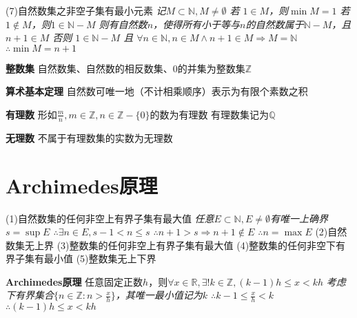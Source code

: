 \documentclass[11pt]{article}
\begin{document}
(7)自然数集之非空子集有最小元素 \newline
\textit{记$M\subset\mathbb{N}, M\not = \emptyset$ \newline
若 $1\in M$，则$\min M=1$ \newline
若 $1\not\in M$，则$1\in\mathbb{N}-M$ \newline
则有自然数$n$，使得所有小于等与$n$的自然数属于$\mathbb{N}-M$，且$n+1\in M$ \newline
否则 $1\in\mathbb{N}-M$ 且 $\forall n\in\mathbb{N}, n\in M\land n+1\in M \Rightarrow M=\mathbb{N}$ \newline
$\therefore \min M=n+1$} \newline

\textbf{整数集}\newline
自然数集、自然数的相反数集、0的并集为整数集$\mathbb{Z}$ \newline

\textbf{算术基本定理} \newline
自然数可唯一地（不计相乘顺序）表示为有限个素数之积 \newline

\textbf{有理数} \newline
形如$\frac{m}{n}, m\in \mathbb{Z}, n\in \mathbb{Z}-\{0\}$的数为有理数 \newline
有理数集记为$\mathbb{Q}$ \newline

\textbf{无理数} \newline
不属于有理数集的实数为无理数

\section{Archimedes原理}
(1)自然数集的任何非空上有界子集有最大值 \newline
\textit{任意$E\subset\mathbb{N}, E\not =\emptyset$有唯一上确界$s=\sup E$ \newline
$\therefore \exists n\in E, s-1<n\le s$ \newline
$\therefore n+1>s\Rightarrow n+1\notin E$ \newline
$\therefore n=\max E$} \newline
(2)自然数集无上界 \newline
(3)整数集的任何非空上有界子集有最大值 \newline
(4)整数集的任何非空下有界子集有最小值 \newline
(5)整数集无上下界 \newline

\textbf{Archimedes原理} \newline
任意固定正数$h$，则$\forall x\in\mathbb{R}, \exists! k\in\mathbb{Z}, (k-1)h\le x<kh$ \newline
\textit{考虑下有界集合$\{n\in\mathbb{Z}:n>\frac{x}{h}\}$，其唯一最小值记为$k$\newline
$\therefore k-1\le\frac{x}{h}<k$ \newline
$\therefore (k-1)h\le x<kh$} \newline
\end{document}

